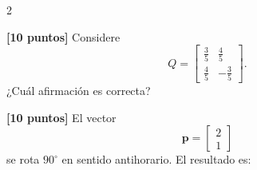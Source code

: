 \documentclass[10pt]{article}
\begin{document}
\begin{multicols}{2}
\begin{question}
            \begin{inlineanswers}
            \end{inlineanswers}
        \end{question}


        \begin{question}
            \textbf{[10 puntos]} Considere
            \[
            Q=
            \begin{bmatrix}
                \frac35 & \frac45\\[1mm]
                \frac45 & -\frac35
            \end{bmatrix}.
            \]
            ¿Cuál afirmación es correcta?

            \begin{answers}
            \end{answers}
        \end{question}

                \columnbreak
        \begin{question}
            \textbf{[10 puntos]} El vector
            \[
            \mathbf{p}=\begin{bmatrix}2\\1\end{bmatrix}
            \]
            se rota $90^\circ$ en sentido antihorario. El resultado es:


\end{question}
\end{multicols}
\end{document}
